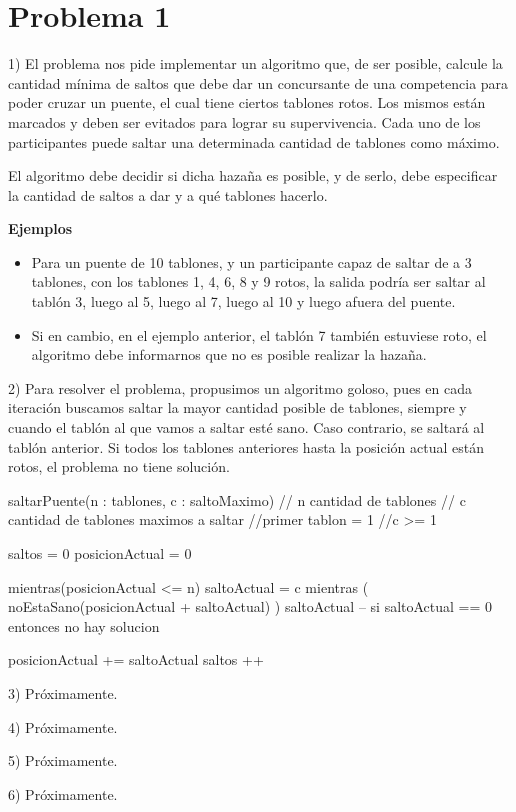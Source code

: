 \documentclass[a4paper]{article}
\begin{document}
\section{Problema 1}

1) El problema nos pide implementar un algoritmo que, de ser posible, calcule la
cantidad mínima de saltos que debe dar un concursante de una competencia para
poder cruzar un puente, el cual tiene ciertos tablones rotos. Los mismos están
marcados y deben ser evitados para lograr su supervivencia. Cada uno de los
participantes puede saltar una determinada cantidad de tablones como máximo.

El algoritmo debe decidir si dicha hazaña es posible, y de serlo, debe especificar
la cantidad de saltos a dar y a qué tablones hacerlo.

\textbf{Ejemplos}
\begin{itemize}
  \item Para un puente de 10 tablones, y un participante capaz de saltar de a 3
  tablones, con los tablones 1, 4, 6, 8 y 9 rotos, la salida podría ser saltar al
  tablón 3, luego al 5, luego al 7, luego al 10 y luego afuera del puente.
  \item Si en cambio, en el ejemplo anterior, el tablón 7 también estuviese roto,
  el algoritmo debe informarnos que no es posible realizar la hazaña.
\end{itemize}


2) Para resolver el problema, propusimos un algoritmo goloso, pues en cada iteración
buscamos saltar la mayor cantidad posible de tablones, siempre y cuando el tablón
al que vamos a saltar esté sano. Caso contrario, se saltará al tablón anterior.
Si todos los tablones anteriores hasta la posición actual están rotos, el problema
no tiene solución.

saltarPuente(n : tablones, c : saltoMaximo)
  // n cantidad de tablones
  // c cantidad de tablones maximos a saltar
  //primer tablon = 1
  //c >= 1
  
  saltos = 0
  posicionActual = 0
  
  mientras(posicionActual <= n)
    saltoActual = c
    mientras ( noEstaSano(posicionActual + saltoActual) )
      saltoActual -- 
      si saltoActual == 0 entonces no hay solucion
    
    posicionActual += saltoActual
    saltos ++

3) Próximamente.

4) Próximamente.

5) Próximamente.

6) Próximamente.
\end{document}
